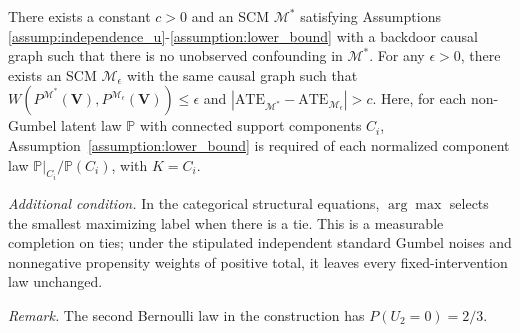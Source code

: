 \begin{proposition}\label{prop:counterexample_foral}
    There exists a constant $c>0$ and an SCM $\mathcal{M}^*$ satisfying Assumptions \ref{assump:independence_u}-\ref{assumption:lower_bound} with a backdoor causal graph such that there is no unobserved confounding in $\mathcal{M}^*$. For any $\epsilon >0$, there exists an SCM $\mathcal{M}_\epsilon$  with the same causal graph such that $W(P^{\mathcal{M}^*}(\boldsymbol{V}),P^{\mathcal{M}_\epsilon}(\boldsymbol{V})) \leq \epsilon $ and $|\text{ATE}_{\mathcal{M}^*} - \text{ATE}_{\mathcal{M}_\epsilon}| > c $.
Here, for each non-Gumbel latent law $\mathbb P$ with connected support components $C_i$, Assumption~\ref{assumption:lower_bound} is required of each normalized component law $\mathbb P|_{C_i}/\mathbb P(C_i)$, with $K=C_i$.

\emph{Additional condition.} In the categorical structural equations, $\arg\max$ selects the smallest maximizing label when there is a tie. This is a measurable completion on ties; under the stipulated independent standard Gumbel noises and nonnegative propensity weights of positive total, it leaves every fixed-intervention law unchanged.
\end{proposition}

\noindent\textit{Remark.} The second Bernoulli law in the construction has $P(U_2=0)=2/3$.


